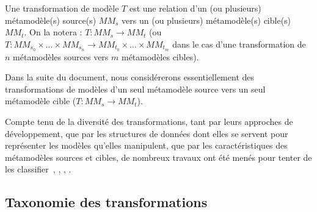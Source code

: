 \begin{definition}
Une transformation de modèle $T$ est une relation d'un (ou plusieurs)
métamodèle(s) source(s) $MM_s$ vers un (ou plusieurs) métamodèle(s) cible(s)
$MM_t$. On la notera : $T : MM_s \rightarrow MM_t$ (ou $T : MM_{s_0} \times
\ldots \times MM_{s_n} \rightarrow MM_{t_0} \times \ldots \times MM_{t_m}$ dans
le cas d'une transformation de $n$ métamodèles sources vers $m$ métamodèles
cibles).
\end{definition}
Dans la suite du document, nous considérerons essentiellement des
transformations de modèles d'un seul métamodèle source vers un seul
métamodèle cible ($T : MM_s \rightarrow MM_t$).

Compte tenu de la diversité des transformations, tant par leurs approches de
développement, que par les structures de données dont elles se servent pour
représenter les modèles qu'elles manipulent, que par les caractéristiques des
métamodèles sources et cibles, de nombreux travaux ont été menés pour tenter de
les classifier~\cite{Czarnecki2003}, \cite{Sendall2003}, \cite{ibm06},
\cite{MensG06}.




\subsection{Taxonomie des transformations}
\label{ssec:taxonomie}

